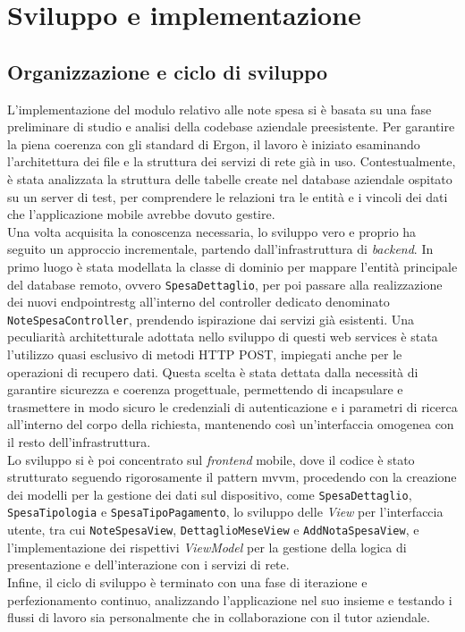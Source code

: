\chapter{Sviluppo e implementazione}
\label{chap:sviluppo-implementazione}

\section{Organizzazione e ciclo di sviluppo}
\label{sec:organizzazione-ciclo-sviluppo}
\noindent L'implementazione del modulo relativo alle note spesa si è basata su una fase preliminare di studio e analisi della codebase aziendale preesistente. Per garantire la piena coerenza con gli standard di Ergon, il lavoro è iniziato esaminando l'architettura dei file e la struttura dei servizi di rete già in uso. Contestualmente, è stata analizzata la struttura delle tabelle create nel database aziendale ospitato su un server di test, per comprendere le relazioni tra le entità e i vincoli dei dati che l'applicazione mobile avrebbe dovuto gestire.\\
Una volta acquisita la conoscenza necessaria, lo sviluppo vero e proprio ha seguito un approccio incrementale, partendo dall'infrastruttura di \textit{backend}. In primo luogo è stata modellata la classe di dominio per mappare l'entità principale del database remoto, ovvero \texttt{SpesaDettaglio}, per poi passare alla realizzazione dei nuovi \gls{endpointrestg} all'interno del controller dedicato denominato \texttt{NoteSpesaController}, prendendo ispirazione dai servizi già esistenti. Una peculiarità architetturale adottata nello sviluppo di questi web services è stata l'utilizzo quasi esclusivo di metodi HTTP POST, impiegati anche per le operazioni di recupero dati. Questa scelta è stata dettata dalla necessità di garantire sicurezza e coerenza progettuale, permettendo di incapsulare e trasmettere in modo sicuro le credenziali di autenticazione e i parametri di ricerca all'interno del corpo della richiesta, mantenendo così un'interfaccia omogenea con il resto dell'infrastruttura. \\
Lo sviluppo si è poi concentrato sul \textit{frontend} mobile, dove il codice è stato strutturato seguendo rigorosamente il pattern \gls{mvvm}, procedendo con la creazione dei modelli per la gestione dei dati sul dispositivo, come \texttt{SpesaDettaglio}, \texttt{SpesaTipologia} e \texttt{SpesaTipoPagamento}, lo sviluppo delle \textit{View} per l'interfaccia utente, tra cui \texttt{NoteSpesaView}, \texttt{DettaglioMeseView} e \texttt{AddNotaSpesaView}, e l'implementazione dei rispettivi \textit{ViewModel} per la gestione della logica di presentazione e dell'interazione con i servizi di rete.\\
Infine, il ciclo di sviluppo è terminato con una fase di iterazione e perfezionamento continuo, analizzando l'applicazione nel suo insieme e testando i flussi di lavoro sia personalmente che in collaborazione con il tutor aziendale. 


